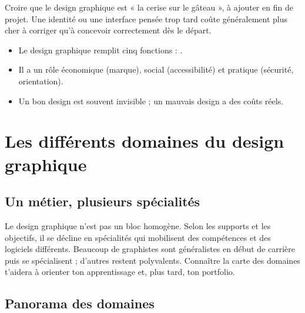 \begin{erreur}
Croire que le design graphique est « la cerise sur le gâteau », à ajouter en fin de projet. Une identité ou une interface pensée trop tard coûte généralement plus cher à corriger qu'à concevoir correctement dès le départ.
\end{erreur}

\begin{retenir}
\begin{itemize}
    \item Le design graphique remplit cinq fonctions : .
    \item Il a un rôle économique (marque), social (accessibilité) et pratique (sécurité, orientation).
    \item Un bon design est souvent invisible ; un mauvais design a des coûts réels.
\end{itemize}
\end{retenir}

\section{Les différents domaines du design graphique}

\subsection{Un métier, plusieurs spécialités}

Le design graphique n'est pas un bloc homogène. Selon les supports et les objectifs, il se décline en spécialités qui mobilisent des compétences et des logiciels différents. Beaucoup de graphistes sont généralistes en début de carrière puis se spécialisent ; d'autres restent polyvalents. Connaître la carte des domaines t'aidera à orienter ton apprentissage et, plus tard, ton portfolio.

\subsection{Panorama des domaines}

